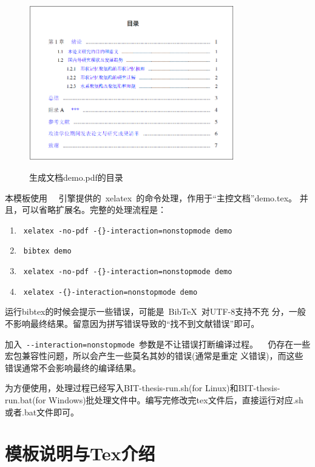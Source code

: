 \begin{figure}[!htp]
  \centering
  {\includegraphics[width=0.8\textwidth]{figures/demo_context}}
  \caption{生成文档demo.pdf的目录}
  \label{fig:demo_context}
\end{figure}

本模板使用~\XeTeX~ 引擎提供的~xelatex~的命令处理，作用于“主控文档”demo.tex。
并且，可以省略扩展名。完整的处理流程是：

{\color{blue}
\begin{enumerate}
\item[] ~\verb|xelatex -no-pdf -{}-interaction=nonstopmode demo|
\item[] ~\verb|bibtex demo| 
\item[] ~\verb|xelatex -no-pdf -{}-interaction=nonstopmode demo|
\item[] ~\verb|xelatex -{}-interaction=nonstopmode demo|
\end{enumerate}}

运行bibtex的时候会提示一些错误，可能是~{{\sc Bib}\TeX}~对UTF-8支持不充
分，一般不影响最终结果。留意因为拼写错误导致的``找不到文献错误''即可。

加入~\verb|--interaction=nonstopmode|~参数是不让错误打断编译过程。
\XeTeX~ 仍存在一些宏包兼容性问题，所以会产生一些莫名其妙的错误(通常是重定
义错误)，而这些错误通常不会影响最终的编译结果。
  
为方便使用，处理过程已经写入BIT-thesis-run.sh(for Linux)和BIT-thesis-run.bat(for Windows)批处理文件中。编写完修改完tex文件后，直接运行对应.sh或者.bat文件即可。


\section{模板说明与Tex介绍}
\label{sec:features}
 
